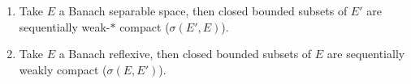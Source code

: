 \documentclass[twoside]{article}
\begin{document}
\begin{prop}
    \begin{enumerate}[label=(\roman*)]
        \item Take $E$ a Banach separable space, then closed bounded subsets of $E'$ are sequentially weak-$*$ compact ($\sigma(E', E)$).
        \item Take $E$ a Banach reflexive, then closed bounded subsets of $E$ are sequentially weakly compact ($\sigma(E, E')$).
    \end{enumerate}
\end{prop}

\end{document}
